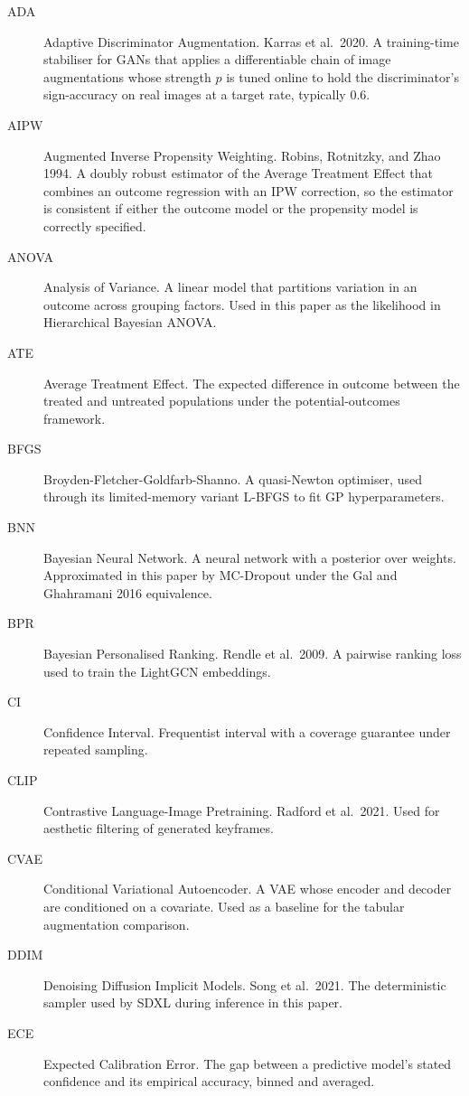 \documentclass{article}
\begin{document}
\begin{description}
\item[ADA] Adaptive Discriminator Augmentation. Karras et al.\ 2020. A training-time stabiliser for GANs that applies a differentiable chain of image augmentations whose strength $p$ is tuned online to hold the discriminator's sign-accuracy on real images at a target rate, typically $0.6$.
\item[AIPW] Augmented Inverse Propensity Weighting. Robins, Rotnitzky, and Zhao 1994. A doubly robust estimator of the Average Treatment Effect that combines an outcome regression with an IPW correction, so the estimator is consistent if either the outcome model or the propensity model is correctly specified.
\item[ANOVA] Analysis of Variance. A linear model that partitions variation in an outcome across grouping factors. Used in this paper as the likelihood in Hierarchical Bayesian ANOVA.
\item[ATE] Average Treatment Effect. The expected difference in outcome between the treated and untreated populations under the potential-outcomes framework.
\item[BFGS] Broyden-Fletcher-Goldfarb-Shanno. A quasi-Newton optimiser, used through its limited-memory variant L-BFGS to fit GP hyperparameters.
\item[BNN] Bayesian Neural Network. A neural network with a posterior over weights. Approximated in this paper by MC-Dropout under the Gal and Ghahramani 2016 equivalence.
\item[BPR] Bayesian Personalised Ranking. Rendle et al.\ 2009. A pairwise ranking loss used to train the LightGCN embeddings.
\item[CI] Confidence Interval. Frequentist interval with a coverage guarantee under repeated sampling.
\item[CLIP] Contrastive Language-Image Pretraining. Radford et al.\ 2021. Used for aesthetic filtering of generated keyframes.
\item[CVAE] Conditional Variational Autoencoder. A VAE whose encoder and decoder are conditioned on a covariate. Used as a baseline for the tabular augmentation comparison.
\item[DDIM] Denoising Diffusion Implicit Models. Song et al.\ 2021. The deterministic sampler used by SDXL during inference in this paper.
\item[ECE] Expected Calibration Error. The gap between a predictive model's stated confidence and its empirical accuracy, binned and averaged.

\end{description}
\end{document}
